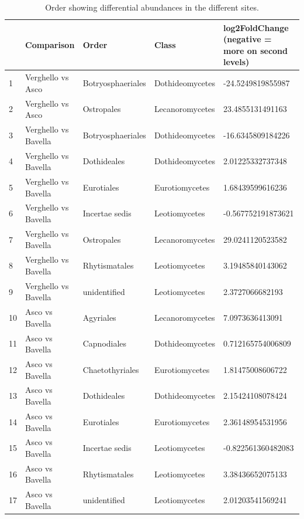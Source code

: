 \documentclass[12pt]{article}\usepackage[]{graphicx}\usepackage[]{color}
\numberwithin{figure}{section}
\begin{document}
\begin{table}[ht]
\centering
\begingroup\tiny
\begin{tabular}{lllll}
  \hline
 & Comparison & Order & Class & log2FoldChange 
 (negative = more on second levels) \\ 
  \hline
1 & Verghello vs Asco & Botryosphaeriales & Dothideomycetes & -24.5249819855987 \\ 
  2 & Verghello vs Asco & Ostropales & Lecanoromycetes & 23.4855131491163 \\ 
  3 & Verghello vs Bavella & Botryosphaeriales & Dothideomycetes & -16.6345809184226 \\ 
  4 & Verghello vs Bavella & Dothideales & Dothideomycetes & 2.01225332737348 \\ 
  5 & Verghello vs Bavella & Eurotiales & Eurotiomycetes & 1.68439599616236 \\ 
  6 & Verghello vs Bavella & Incertae sedis & Leotiomycetes & -0.567752191873621 \\ 
  7 & Verghello vs Bavella & Ostropales & Lecanoromycetes & 29.0241120523582 \\ 
  8 & Verghello vs Bavella & Rhytismatales & Leotiomycetes & 3.19485840143062 \\ 
  9 & Verghello vs Bavella & unidentified & Leotiomycetes & 2.3727066682193 \\ 
  10 & Asco vs Bavella & Agyriales & Lecanoromycetes & 7.0973636413091 \\ 
  11 & Asco vs Bavella & Capnodiales & Dothideomycetes & 0.712165754006809 \\ 
  12 & Asco vs Bavella & Chaetothyriales & Eurotiomycetes & 1.81475008606722 \\ 
  13 & Asco vs Bavella & Dothideales & Dothideomycetes & 2.15424108078424 \\ 
  14 & Asco vs Bavella & Eurotiales & Eurotiomycetes & 2.36148954531956 \\ 
  15 & Asco vs Bavella & Incertae sedis & Leotiomycetes & -0.822561360482083 \\ 
  16 & Asco vs Bavella & Rhytismatales & Leotiomycetes & 3.38436652075133 \\ 
  17 & Asco vs Bavella & unidentified & Leotiomycetes & 2.01203541569241 \\ 
   \hline
\end{tabular}
\endgroup
\caption{Order showing differential abundances in the different sites.} 
\end{table}
\end{document}
